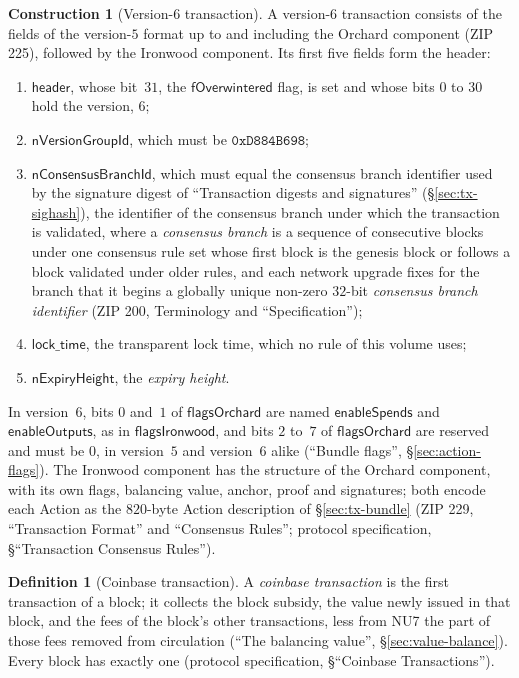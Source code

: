 \documentclass[11pt,a4paper]{article}
\theoremstyle{definition}
\newtheorem{definition}[theorem]{Definition}
\newtheorem{construction}[theorem]{Construction}
\begin{document}
\begin{construction}[Version-6 transaction]
A version-$6$ transaction consists of the fields of the version-$5$ format
up to and including the Orchard component (ZIP 225), followed by the
Ironwood component. Its first five fields form the header:
\begin{enumerate}[label=(\roman*)]
\item $\mathsf{header}$, whose bit~$31$, the $\mathsf{fOverwintered}$ flag,
  is set and whose bits $0$ to $30$ hold the version, $6$;
\item $\mathsf{nVersionGroupId}$, which must be $\mathtt{0xD884B698}$;
\item $\mathsf{nConsensusBranchId}$, which must equal the consensus branch
  identifier used by the signature digest of ``Transaction digests and
  signatures'' (\S\ref{sec:tx-sighash}), the identifier of the consensus
  branch under which the transaction is validated, where a \emph{consensus
  branch} is a sequence of consecutive blocks under one consensus rule set
  whose first block is the genesis block or follows a block validated under
  older rules, and each network upgrade fixes for the branch that it begins
  a globally unique non-zero $32$-bit \emph{consensus branch identifier}
  (ZIP 200, Terminology and ``Specification'');
\item $\mathsf{lock\_time}$, the transparent lock time, which no rule of
  this volume uses;
\item $\mathsf{nExpiryHeight}$, the \emph{expiry height}.
\end{enumerate}
In version~$6$, bits $0$ and~$1$ of $\mathsf{flagsOrchard}$ are named
$\mathsf{enableSpends}$ and $\mathsf{enableOutputs}$, as in
$\mathsf{flagsIronwood}$, and bits $2$ to~$7$ of $\mathsf{flagsOrchard}$ are
reserved and must be $0$, in version~$5$ and version~$6$ alike (``Bundle
flags'', \S\ref{sec:action-flags}). The Ironwood component has the structure
of the Orchard component, with its own flags, balancing value, anchor, proof
and signatures; both encode each Action as the $820$-byte Action description
of \S\ref{sec:tx-bundle} (ZIP 229, ``Transaction Format'' and ``Consensus
Rules''; protocol specification, \S``Transaction Consensus Rules'').
\end{construction}

\begin{definition}[Coinbase transaction]
A \emph{coinbase transaction} is the first transaction of a block; it
collects the block subsidy, the value newly issued in that block, and the
fees of the block's other transactions, less from NU7 the part of those fees
removed from circulation (``The balancing value'',
\S\ref{sec:value-balance}). Every block has exactly one (protocol
specification, \S``Coinbase Transactions'').
\end{definition}
\end{document}
